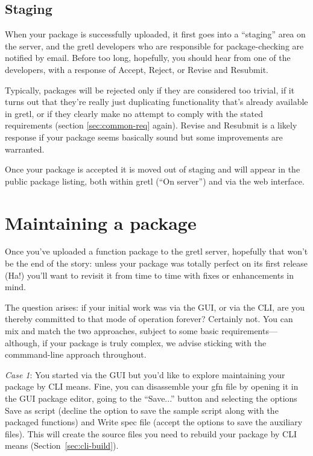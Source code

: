 \documentclass[oneside]{book}
\begin{document}
\subsection{Staging}

When your package is successfully uploaded, it first goes into a
``staging'' area on the server, and the gretl developers who are
responsible for package-checking are notified by email. Before too
long, hopefully, you should hear from one of the developers, with a
response of Accept, Reject, or Revise and Resubmit.

Typically, packages will be rejected only if they are considered too
trivial, if it turns out that they're really just duplicating
functionality that's already available in gretl, or if they clearly
make no attempt to comply with the stated requirements (section
\ref{sec:common-req} again). Revise and Resubmit is a likely response
if your package seems basically sound but some improvements are
warranted.

Once your package is accepted it is moved out of staging and will
appear in the public package listing, both within gretl (``On
server'') and via the web interface.


\section{Maintaining a package}
\label{sec:maint}

Once you've uploaded a function package to the gretl server, hopefully
that won't be the end of the story: unless your package was totally
perfect on its first release (Ha!) you'll want to revisit it from time
to time with fixes or enhancements in mind.

The question arises: if your initial work was via the GUI, or via the
CLI, are you thereby committed to that mode of operation forever?
Certainly not. You can mix and match the two approaches, subject to
some basic requirements---although, if your package is truly complex,
we advise sticking with the commmand-line approach throughout.

\textit{Case 1}: You started via the GUI but you'd like to explore
maintaining your package by CLI means. Fine, you can disassemble your
\textsf{gfn} file by opening it in the GUI package editor, going to
the ``\textsf{Save...}'' button and selecting the options \textsf{Save
  as script} (decline the option to save the sample script along with
the packaged functions) and \textsf{Write spec file} (accept the
options to save the auxiliary files). This will create the source
files you need to rebuild your package by CLI means
(Section~\ref{sec:cli-build}).
\end{document}
